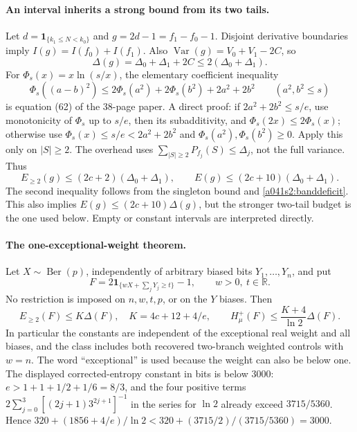 \paragraph{An interval inherits a strong bound from its two tails.}
Let $d=\mathbf1_{\{k_1\le N<k_0\}}$ and $g=2d-1=f_1-f_0-1$.
Disjoint derivative boundaries imply $I(g)=I(f_0)+I(f_1)$.
Also $\operatorname{Var}(g)=V_0+V_1-2C$, so
\begin{equation}\label{a041s2:banddeficit}
 \Delta(g)=\Delta_0+\Delta_1+2C
 \le2(\Delta_0+\Delta_1).
\end{equation}
For $\Phi_s(x)=x\ln(s/x)$, the elementary coefficient inequality
\begin{equation}\label{a041s2:coherent}
 \Phi_s((a-b)^2)\le2\Phi_s(a^2)+2\Phi_s(b^2)+2a^2+2b^2
 \qquad(a^2,b^2\le s)
\end{equation}
is equation (62) of the 38-page paper. A direct proof: if
$2a^2+2b^2\le s/e$, use monotonicity of $\Phi_s$ up to $s/e$, then
its subadditivity, and $\Phi_s(2x)\le2\Phi_s(x)$; otherwise use
$\Phi_s(x)\le s/e<2a^2+2b^2$ and $\Phi_s(a^2),\Phi_s(b^2)\ge0$.
Apply this only on $|S|\ge2$. The overhead uses
$\sum_{|S|\ge2}P_{f_j}(S)\le\Delta_j$, not the full variance.
Thus
\[
 E_{\ge2}(g)\le(2c+2)(\Delta_0+\Delta_1),\qquad
 E(g)\le(2c+10)(\Delta_0+\Delta_1).
\]
The second inequality follows from the singleton bound and
\eqref{a041s2:banddeficit}. This also implies
$E(g)\le(2c+10)\Delta(g)$, but the stronger two-tail budget is the
one used below. Empty or constant intervals are interpreted directly.

\paragraph{The one-exceptional-weight theorem.}
Let $X\sim\operatorname{Ber}(p)$, independently of arbitrary biased
bits $Y_1,\ldots,Y_n$, and put
\[
 F=2\mathbf1_{\{wX+\sum_jY_j\ge t\}}-1,
 \qquad w>0,\ t\in\mathbb R.
\]
No restriction is imposed on $n,w,t,p$, or on the $Y$ biases.
Then
\begin{equation}\label{a041s2:oneheavy}
 E_{\ge2}(F)\le K\Delta(F),\quad K=4c+12+4/e,
 \qquad H^+_\mu(F)\le\frac{K+4}{\ln2}\Delta(F).
\end{equation}
In particular the constants are independent of the exceptional real
weight and all biases, and the class includes both recovered two-branch
weighted controls with $w=n$. The word ``exceptional'' is used because
the weight can also be below one.
The displayed corrected-entropy constant in bits is below $3000$:
$e>1+1+1/2+1/6=8/3$, and the four positive terms
$2\sum_{j=0}^3[(2j+1)3^{2j+1}]^{-1}$ in the series for $\ln2$
already exceed $3715/5360$. Hence
$320+(1856+4/e)/\ln2<320+(3715/2)/(3715/5360)=3000$.

